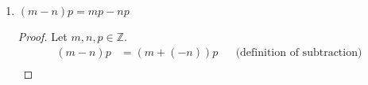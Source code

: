 \begin{enumerate}[label=(\roman*)]
\begin{proof}
              $(\Leftarrow)$ Assume $m+q=n+p$. Then:
              \begin{align*}
                  m+q        & = n+p               &  & \tag{assumption}                   \\
                  (m+q)+(-q) & = (n+p)+(-q)        &  & \text{(Axiom 1.1(i))}              \\
                  m+(q+(-q)) & = n+(p+(-q))        &  & \text{(Axiom 1.1(ii))}             \\
                  m+0        & = n+(p+(-q))        &  & \text{(Axiom 1.4)}                 \\
                  m          & = n+(p+(-q))        &  & \text{(Axiom 1.2)}                 \\
                  m+(-n)     & = (n+(p+(-q)))+(-n) &  & \text{(Axiom 1.1(i))}              \\
                  m+(-n)     & = (n+(-n))+(p+(-q)) &  & \text{(Axiom 1.1(ii))}             \\
                  m+(-n)     & = 0+(p+(-q))        &  & \text{(Axiom 1.4)}                 \\
                  m+(-n)     & = p+(-q)            &  & \text{(Axiom 1.2)}                 \\
                  m-n        & = p-q               &  & \text{(definition of subtraction)}
              \end{align*}
              Therefore, $m-n=p-q$ if and only if $m+q=n+p$ for all $m,n,p,q \in \mathbb{Z}$.
          \end{proof}
    \item $(m-n)p=mp-np$
          \begin{proof}
              Let $m,n,p \in \mathbb{Z}$.
              \begin{align*}
                  (m-n)p & = (m+(-n))p &  & \text{(definition of subtraction)} \\

\end{align*}
\end{proof}
\end{enumerate}
